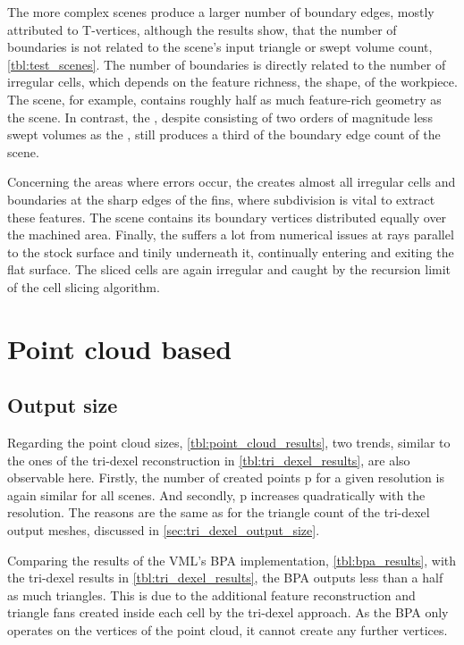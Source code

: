 The more complex scenes produce a larger number of boundary edges, mostly attributed to T-vertices, although the results show, that the number of boundaries is not related to the scene's input triangle or swept volume count, \cf \cref{tbl:test_scenes}.
The number of boundaries is directly related to the number of irregular cells, which depends on the feature richness, \ie the shape, of the workpiece.
The \impellerhalf scene, for example, contains roughly half as much feature-rich geometry as the \impeller scene.
In contrast, the \cylinderhead, despite consisting of two orders of magnitude less swept volumes as the \impeller, still produces a third of the boundary edge count of the \impeller scene.

Concerning the areas where errors occur, the \cylinderhead creates almost all irregular cells and boundaries at the sharp edges of the fins, where subdivision is vital to extract these features.
The \impeller scene contains its boundary vertices distributed equally over the machined area.
Finally, the \turbine suffers a lot from numerical issues at rays parallel to the stock surface and tinily underneath it, continually entering and exiting the flat surface.
The sliced cells are again irregular and caught by the recursion limit of the cell slicing algorithm.


\section{Point cloud based}
\label{sec:point_cloud_discussion}


\subsection {Output size}

Regarding the point cloud sizes, \cf \cref{tbl:point_cloud_results}, two trends, similar to the ones of the tri-dexel reconstruction in \cref{tbl:tri_dexel_results}, are also observable here.
Firstly, the number of created points p for a given resolution is again similar for all scenes.
And secondly, p increases quadratically with the resolution.
The reasons are the same as for the triangle count of the tri-dexel output meshes, discussed in \cref{sec:tri_dexel_output_size}.

Comparing the results of the VML's BPA implementation, \cf \cref{tbl:bpa_results}, with the tri-dexel results in \cref{tbl:tri_dexel_results}, the BPA outputs less than a half as much triangles.
This is due to the additional feature reconstruction and triangle fans created inside each cell by the tri-dexel approach.
As the BPA only operates on the vertices of the point cloud, it cannot create any further vertices.

